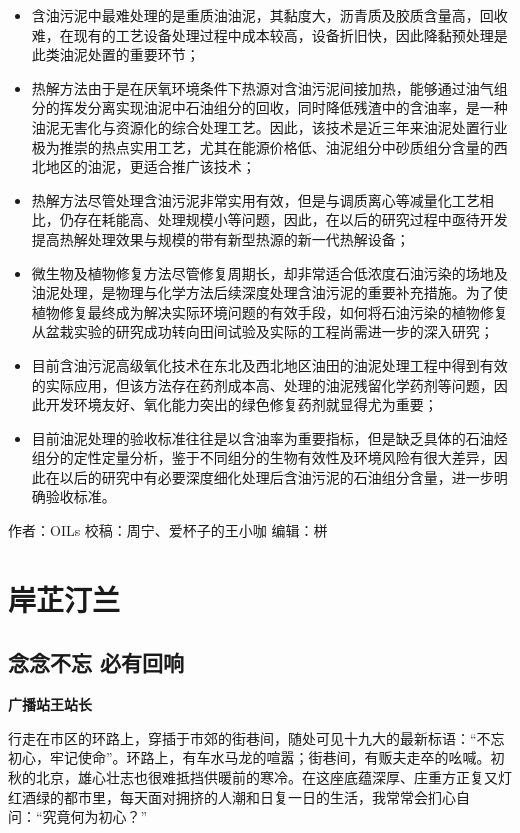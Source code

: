\documentclass[]{book}
\begin{document}
\begin{itemize}
\item
  含油污泥中最难处理的是重质油油泥，其黏度大，沥青质及胶质含量高，回收难，在现有的工艺设备处理过程中成本较高，设备折旧快，因此降黏预处理是此类油泥处置的重要环节；
\item
  热解方法由于是在厌氧环境条件下热源对含油污泥间接加热，能够通过油气组分的挥发分离实现油泥中石油组分的回收，同时降低残渣中的含油率，是一种油泥无害化与资源化的综合处理工艺。因此，该技术是近三年来油泥处置行业极为推崇的热点实用工艺，尤其在能源价格低、油泥组分中砂质组分含量的西北地区的油泥，更适合推广该技术；
\item
  热解方法尽管处理含油污泥非常实用有效，但是与调质离心等减量化工艺相比，仍存在耗能高、处理规模小等问题，因此，在以后的研究过程中亟待开发提高热解处理效果与规模的带有新型热源的新一代热解设备；
\item
  微生物及植物修复方法尽管修复周期长，却非常适合低浓度石油污染的场地及油泥处理，是物理与化学方法后续深度处理含油污泥的重要补充措施。为了使植物修复最终成为解决实际环境问题的有效手段，如何将石油污染的植物修复从盆栽实验的研究成功转向田间试验及实际的工程尚需进一步的深入研究；
\item
  目前含油污泥高级氧化技术在东北及西北地区油田的油泥处理工程中得到有效的实际应用，但该方法存在药剂成本高、处理的油泥残留化学药剂等问题，因此开发环境友好、氧化能力突出的绿色修复药剂就显得尤为重要；
\item
  目前油泥处理的验收标准往往是以含油率为重要指标，但是缺乏具体的石油烃组分的定性定量分析，鉴于不同组分的生物有效性及环境风险有很大差异，因此在以后的研究中有必要深度细化处理后含油污泥的石油组分含量，进一步明确验收标准。
\end{itemize}

作者：OILs 校稿：周宁、爱杯子的王小咖 编辑：栟

\chapter{岸芷汀兰}

\section{念念不忘 必有回响}\label{-}

\textbf{广播站王站长}

行走在市区的环路上，穿插于市郊的街巷间，随处可见十九大的最新标语：``不忘初心，牢记使命''。环路上，有车水马龙的喧嚣；街巷间，有贩夫走卒的吆喊。初秋的北京，雄心壮志也很难抵挡供暖前的寒冷。在这座底蕴深厚、庄重方正复又灯红酒绿的都市里，每天面对拥挤的人潮和日复一日的生活，我常常会扪心自问：``究竟何为初心？''
\end{document}
